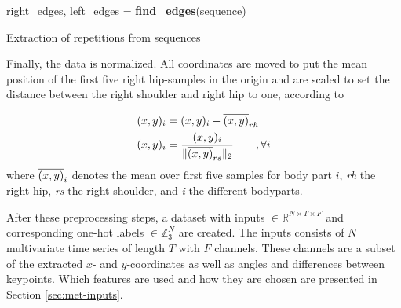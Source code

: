 \begin{algorithm}
\SetAlgoLined
right\_edges, left\_edges = \textbf{find\_edges}(sequence)\;
 \For{\textup{peak, right, current\_left, next\_left} in \textup{peaks, right\_edges, left\_edges}}{
  split\_index = \textbf{mean}(right, next\_left)\;
  start = \textbf{max}(current\_left - extra\_points, 0)\;
  end = \textbf{min}(right + extra\_points, split\_index)\;
  \textit{repetition} = \textbf{normalize\_length}(sequence[start:end])\;
  sequence = sequence[end:]\;
 }
 \caption{Extraction of repetitions from sequences}
 \label{alg:rep}
\end{algorithm}


Finally, the data is normalized. All coordinates are moved to put the mean position of the first five right hip-samples in the origin and are scaled to set the distance between the right shoulder and right hip to one, according to

\begin{align}
  \begin{split}
    (x,y)_i &= (x,y)_i - {\mathop{\overline{(x,y)}}}_{rh} \\
    (x,y)_i &= \frac{(x,y)_i}{\lVert \mathop{\overline{(x,y)}}_{rs} \rVert_2} \qquad , \forall i
  \end{split}
  \label{eq:met-normalization}
\end{align}
where $\mathop{\overline{(x,y)}}_i$ denotes the mean over first five samples for body part $i$, \textit{rh} the right hip, \textit{rs} the right shoulder, and \textit{i} the different bodyparts.

After these preprocessing steps, a dataset with inputs $\in \mathbb{R}^{N \times T \times F}$ and corresponding one-hot labels $\in \mathbb{Z}_3^N$ are created. The inputs consists of $N$ multivariate time series of length $T$ with $F$ channels. These channels are a subset of the extracted $x$- and $y$-coordinates as well as angles and differences between keypoints. Which features are used and how they are chosen are presented in Section \ref{sec:met-inputs}.

